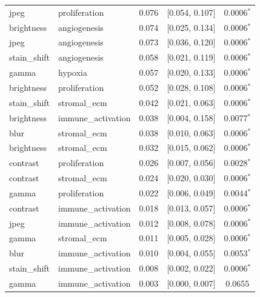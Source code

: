 \begin{table}[t]
\begin{tabular}{llccc}
jpeg & proliferation & 0.076 & [0.054, 0.107] & 0.0006$^{*}$ \\
brightness & angiogenesis & 0.074 & [0.025, 0.134] & 0.0006$^{*}$ \\
jpeg & angiogenesis & 0.073 & [0.036, 0.120] & 0.0006$^{*}$ \\
stain\_shift & angiogenesis & 0.058 & [0.021, 0.119] & 0.0006$^{*}$ \\
gamma & hypoxia & 0.057 & [0.020, 0.133] & 0.0006$^{*}$ \\
brightness & proliferation & 0.052 & [0.028, 0.108] & 0.0006$^{*}$ \\
stain\_shift & stromal\_ecm & 0.042 & [0.021, 0.063] & 0.0006$^{*}$ \\
brightness & immune\_activation & 0.038 & [0.004, 0.158] & 0.0077$^{*}$ \\
blur & stromal\_ecm & 0.038 & [0.010, 0.063] & 0.0006$^{*}$ \\
brightness & stromal\_ecm & 0.032 & [0.015, 0.062] & 0.0006$^{*}$ \\
contrast & proliferation & 0.026 & [0.007, 0.056] & 0.0028$^{*}$ \\
contrast & stromal\_ecm & 0.024 & [0.020, 0.030] & 0.0006$^{*}$ \\
gamma & proliferation & 0.022 & [0.006, 0.049] & 0.0044$^{*}$ \\
contrast & immune\_activation & 0.018 & [0.013, 0.057] & 0.0006$^{*}$ \\
jpeg & immune\_activation & 0.012 & [0.008, 0.078] & 0.0006$^{*}$ \\
gamma & stromal\_ecm & 0.011 & [0.005, 0.028] & 0.0006$^{*}$ \\
blur & immune\_activation & 0.010 & [0.004, 0.055] & 0.0053$^{*}$ \\
stain\_shift & immune\_activation & 0.008 & [0.002, 0.022] & 0.0006$^{*}$ \\
gamma & immune\_activation & 0.003 & [0.000, 0.007] & 0.0655 \\
\bottomrule
\end{tabular}
\end{table}
